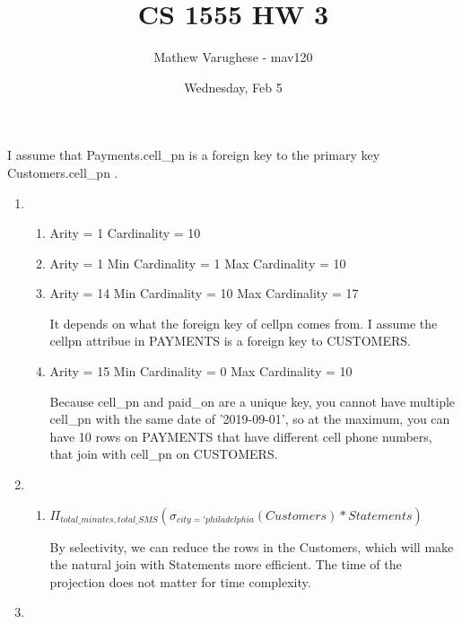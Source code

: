 \documentclass[12pt]{article}
\begin{document}
\title{CS 1555 HW 3}
\author{Mathew Varughese - mav120} 
\date{Wednesday, Feb 5}

\maketitle

I assume that Payments.cell\_pn is a foreign key to the primary key Customers.cell\_pn .

\begin{enumerate}

\item

\begin{enumerate}

\item
Arity = 1
Cardinality = 10

\item
Arity = 1
Min Cardinality = 1
Max Cardinality = 10

\item
Arity = 14
Min Cardinality = 10
Max Cardinality = 17

It depends on what the foreign key of cell\textunderscore pn comes from. 
I assume the
cell\textunderscore pn attribue in PAYMENTS is a foreign key to CUSTOMERS.

\item
Arity = 15 
Min Cardinality = 0
Max Cardinality = 10

Because cell\_pn and paid\_on are a unique key, you cannot
have multiple cell\_pn with the same date of '2019-09-01', so at the maximum, you
can have 10 rows on PAYMENTS that have different cell phone numbers, that join with
cell\_pn on CUSTOMERS.

\end{enumerate}


\item

\begin{enumerate}

\item
$ \Pi_{total\_minutes, total\_SMS}(\sigma_{city = 'philadelphia}(Customers) * Statements)$

By selectivity, we can reduce the rows in the Customers, 
which will make the natural join with Statements more efficient.
The time of the projection does not matter for time complexity.

\end{enumerate}

\item


\end{enumerate}
\end{document}
